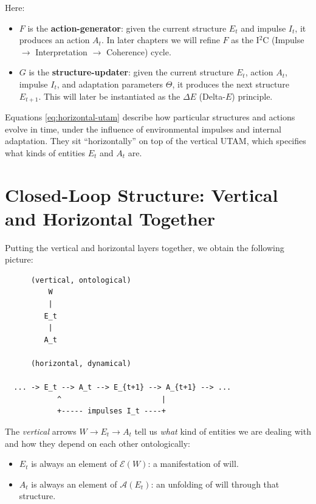 \documentclass[12pt,a4paper]{report}
\newcommand{\Will}{W}
\begin{document}
Here:

\begin{itemize}[leftmargin=2em]
    \item \(F\) is the \textbf{action-generator}: given the current structure \(E_t\) and impulse \(I_t\), it produces an action \(A_t\). In later chapters we will refine \(F\) as the I$^2$C (Impulse $\to$ Interpretation $\to$ Coherence) cycle.
    \item \(G\) is the \textbf{structure-updater}: given the current structure \(E_t\), action \(A_t\), impulse \(I_t\), and adaptation parameters \(\Theta\), it produces the next structure \(E_{t+1}\). This will later be instantiated as the $\Delta E$ (Delta-\(E\)) principle.
\end{itemize}

Equations \eqref{eq:horizontal-utam} describe how particular structures and actions evolve in time, under the influence of environmental impulses and internal adaptation. They sit ``horizontally'' on top of the vertical UTAM, which specifies what kinds of entities \(E_t\) and \(A_t\) are.

\section{Closed-Loop Structure: Vertical and Horizontal Together}

Putting the vertical and horizontal layers together, we obtain the following picture:

\begin{center}
\begin{minipage}{0.9\textwidth}
\begin{verbatim}
      (vertical, ontological)
          W
          |
         E_t
          |
         A_t

      (horizontal, dynamical)

  ... -> E_t --> A_t --> E_{t+1} --> A_{t+1} --> ...
            ^                       |
            +----- impulses I_t ----+
\end{verbatim}

\end{minipage}
\end{center}

The \emph{vertical} arrows \( \Will \to E_t \to A_t \) tell us \emph{what} kind of entities we are dealing with and how they depend on each other ontologically:

\begin{itemize}[leftmargin=2em]
    \item \(E_t\) is always an element of \(\mathcal{E}(\Will)\): a manifestation of will.
    \item \(A_t\) is always an element of \(\mathcal{A}(E_t)\): an unfolding of will through that structure.
\end{itemize}
\end{document}
